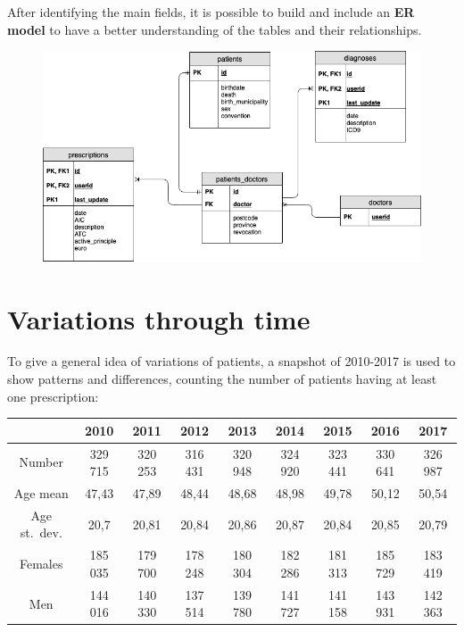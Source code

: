 After identifying the main fields, it is possible to build and include an \textbf{ER model}\cite{draw} to have a better understanding of the tables and their relationships.
\smallskip
\begin{figure}[h]
	\centering
	\includegraphics[scale=0.58]{images/er.png}
\end{figure}

\section{Variations through time}
To give a general idea of variations of patients, a snapshot of 2010-2017 is used to show patterns and differences, counting the number of patients having at least one prescription:
\begin{center}
	\small
	\begin{tabular}{c|c|c|c|c|c|c|c|c}
		  & 2010 & 2011 & 2012 & 2013 & 2014 & 2015 & 2016 & 2017 \\
		\hline
		Number & 329 715 & 320 253 & 316 431 & 320 948 & 324 920 & 323 441 & 330 641 & 326 987 \\
		\hline
		Age mean & 47,43 & 47,89 & 48,44 & 48,68 & 48,98 & 49,78 & 50,12 & 50,54 \\
		\hline
		Age st.\ dev. & 20,7 & 20,81 & 20,84 & 20,86 & 20,87 & 20,84 & 20,85 & 20,79 \\
		\hline
		Females & 185 035 & 179 700 & 178 248 & 180 304 & 182 286 & 181 313 & 185 729 & 183 419 \\
		\hline
		Men & 144 016 & 140 330 & 137 514 & 139 780 & 141 727 & 141 158 & 143 931 & 142 363 \\
	\end{tabular}
\end{center}
\medskip

